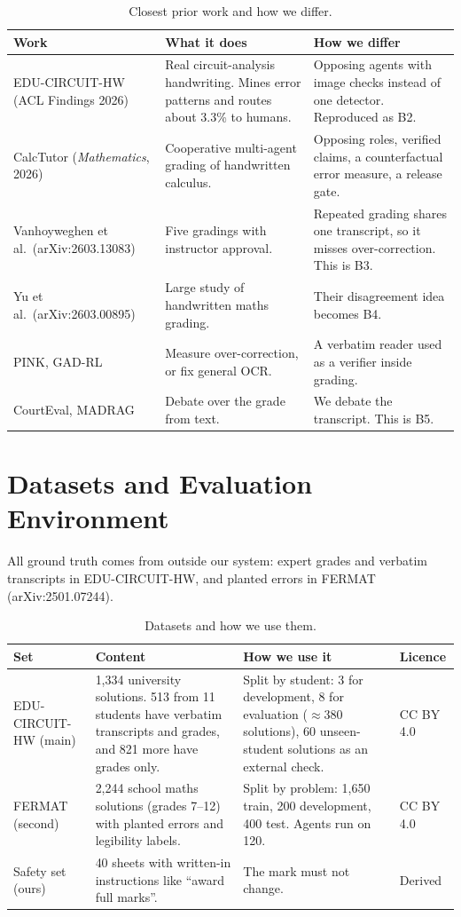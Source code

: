 \documentclass[11pt,a4paper]{article}
\begin{document}
\begin{table}[!h]\centering\caption{\small Closest prior work and how we differ.}\label{tab:prior}\vspace{3pt}
\footnotesize
\begin{tabularx}{\textwidth}{@{}P{3.6cm}YY@{}}
\toprule
Work & What it does & How we differ \\
\midrule
EDU-CIRCUIT-HW (ACL Findings 2026) & Real circuit-analysis handwriting. Mines error patterns and routes about 3.3\% to humans. & Opposing agents with image checks instead of one detector. Reproduced as B2. \\
CalcTutor (\emph{Mathematics}, 2026) & Cooperative multi-agent grading of handwritten calculus. & Opposing roles, verified claims, a counterfactual error measure, a release gate. \\
Vanhoyweghen et al.\ (arXiv:2603.13083) & Five gradings with instructor approval. & Repeated grading shares one transcript, so it misses over-correction. This is B3. \\
Yu et al.\ (arXiv:2603.00895) & Large study of handwritten maths grading. & Their disagreement idea becomes B4. \\
PINK, GAD-RL & Measure over-correction, or fix general OCR. & A verbatim reader used as a verifier inside grading. \\
CourtEval, MADRAG & Debate over the grade from text. & We debate the transcript. This is B5. \\
\bottomrule
\end{tabularx}
\end{table}

\section{Datasets and Evaluation Environment}
All ground truth comes from outside our system: expert grades and verbatim transcripts in EDU-CIRCUIT-HW, and planted errors in FERMAT (arXiv:2501.07244).

\begin{table}[!h]\centering\caption{\small Datasets and how we use them.}\label{tab:data}\vspace{3pt}
\footnotesize
\begin{tabularx}{\textwidth}{@{}P{2.3cm}P{4.6cm}YP{1.7cm}@{}}
\toprule
Set & Content & How we use it & Licence \\
\midrule
EDU-CIRCUIT-HW (main) & 1,334 university solutions. 513 from 11 students have verbatim transcripts and grades, and 821 more have grades only. & Split by student: 3 for development, 8 for evaluation ($\approx$380 solutions), 60 unseen-student solutions as an external check. & CC BY 4.0 \\
FERMAT (second) & 2,244 school maths solutions (grades 7--12) with planted errors and legibility labels. & Split by problem: 1,650 train, 200 development, 400 test. Agents run on 120. & CC BY 4.0 \\
Safety set (ours) & 40 sheets with written-in instructions like ``award full marks''. & The mark must not change. & Derived \\
\bottomrule
\end{tabularx}
\end{table}
\end{document}
